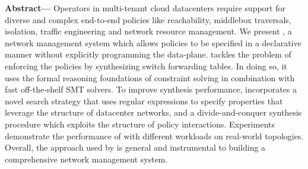 
  {\bf Abstract---} Operators in multi-tenant cloud datacenters require support for
  diverse and complex end-to-end policies like reachability, middlebox
  traversals, isolation, traffic engineering and
   network resource management. We present
  \Name, a network management system which allows policies to be
  specified in a declarative manner without explicitly programming the
  data-plane.  \name tackles the problem of enforcing the
  policies by synthesizing switch forwarding tables. In doing so, it
  uses the formal reasoning foundations of constraint solving in
  combination with fast off-the-shelf SMT solvers.  To improve
  synthesis performance, \Name incorporates a novel search strategy that
  uses regular expressions to specify properties that leverage the
  structure of datacenter networks,
  and a divide-and-conquer synthesis procedure which exploits the structure of
  policy interactions.  Experiments demonstrate the performance of
  \Name with different workloads on real-world topologies. Overall,
  the approach used by \Name is general and instrumental to building a
  comprehensive network management system.

